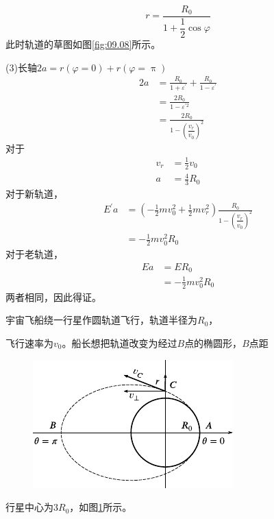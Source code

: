 \begin{equation*}
  r = \frac { R _ { 0 } } { 1 + \dfrac { 1 } { 2 } \cos \varphi }
\end{equation*}
此时轨道的草图如图\ref{fig:09.08}所示。

(3)长轴$ 2 a = r \left( \varphi = 0 \right) + r \left( \varphi = \uppi \right) $
\begin{equation*}
  \begin{split}
    2 a &= \frac { R _ { 0 } } { 1 + \varepsilon ^ { \prime } } + \frac { R _ { 0 } } { 1 - \varepsilon ^ { \prime } }  \\
    &= \frac { 2 R _ { 0 } } { 1 - \varepsilon ^ { \prime 2 } } \\
    &= \frac { 2 R _ { 0 } } { 1 - \left( \dfrac { v _ { r } } { v _ { 0 } } \right) ^ { 2 }}
  \end{split}
\end{equation*}
对于
\begin{align*}
  v _ { r } & = \frac { 1 } { 2 } v _ { 0 } \\
  a         & = \frac { 4 } { 3 } R _ { 0 }
\end{align*}
对于新轨道，
\begin{equation*}
  \begin{split}
    E^{\prime} a &=\left(-\frac{1}{2} m v_{0}^{2}+\frac{1}{2} m v_{r}^{2}\right) \frac{R_{0}}{1-\left(\dfrac{v_{r}}{v_{0}}\right)^{2}} \\
    &=-\frac{1}{2} m v_{0}^{2} R_{0}
  \end{split}
\end{equation*}
对于老轨道，
\begin{equation*}
  \begin{split}
    E a &= E R _ { 0 } \\
    &= - \frac { 1 } { 2 } m v _ 0 ^ { 2 } R _ { 0 }
  \end{split}
\end{equation*}
两者相同，因此得证。


\example 宇宙飞船绕一行星作圆轨道飞行，轨道半径为$ R _ 0 $，

\clearpage\noindent 飞行速率为$ v _ { 0 } $。船长想把轨道改变为经过$ B $点的椭圆形，$ B $点距
\begin{figure}
  \centering
  \includegraphics{figure/fig09.09}
  \caption{}
  \label{fig:09.09}
\end{figure}
行星中心为$ 3 R _ { 0 } $，如图\ref{fig:09.09}所示。

